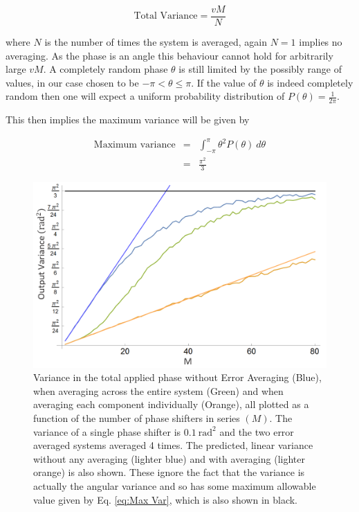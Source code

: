 \documentclass[aps,pra,twocolumn,superscriptaddress,numerical]{revtex4-1}
\begin{document}
		\begin{equation}
		\textrm{Total Variance}=\frac{vM}{N}\label{eq:Tot Var w/ correction}
		\end{equation}
		
		
		where $N$ is the number of times the system is averaged, again $N=1$ implies no averaging. As the phase is an angle this behaviour cannot hold for arbitrarily large $vM$. A completely random phase $\theta$ is still limited by the possibly range of values, in our case chosen to be $-\pi<\theta\le\pi$. If the value of $\theta$ is indeed completely random then one will expect a uniform probability distribution of $P\left(\theta\right)=\frac{1}{2\pi}$. 
		
		This then implies the maximum variance will be given by
		
		\begin{eqnarray}
		\textrm{Maximum variance} & = & \int_{-\pi}^{\pi}\theta^{2}P\left(\theta\right)\ d\theta\nonumber \\
		& = & \frac{\pi^{2}}{3}\label{eq:Max Var}
		\end{eqnarray}
		
		
		\begin{figure}
			\begin{centering}
				\includegraphics[width=\columnwidth]{phase_all.png}
				\par\end{centering}
			
			\caption[Variance of the total applied phase as a function of the number of components. ]{Variance in the total applied phase without Error Averaging (Blue), when averaging across the entire system (Green) and when averaging each component individually (Orange), all plotted as a function of the number of phase shifters in series $(M)$. The variance of a single phase shifter is $0.1\ \textrm{rad}^{2}$ and the two error averaged systems averaged 4 times. The predicted, linear variance without any averaging (lighter blue) and with averaging (lighter orange) is also shown. These ignore the fact that the variance is actually the angular variance and so has some maximum allowable value given by Eq. \ref{eq:Max Var}, which is also shown in black. \label{fig:Variance-in-phase all}}
			
			
		\end{figure}
		
\end{document}
